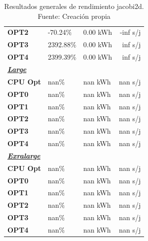 \begin{table}[H]
\begin{tabular}{lllr}
    \cellcolor[HTML]{DAE8FC} \textbf{OPT2} & -70.24\%  &	0.00 kWh  &	-inf s/j \\
    \rowcolor[HTML]{EFEFEF} \cellcolor[HTML]{DAE8FC} \textbf{OPT3} &2392.88\%  &	0.00 kWh  &	inf s/j \\
    \cellcolor[HTML]{DAE8FC} \textbf{OPT4} & 2399.39\%  &	0.00 kWh  &	inf s/j \\
    \rowcolor[HTML]{EFEFEF} \cellcolor[HTML]{DAE8FC} \textbf{\textbf{{\emph{{\underline{{Large}}}}}}} &&	&	 \\
    \cellcolor[HTML]{DAE8FC} \textbf{CPU Opt} & nan\%  &	nan kWh  &	nan s/j \\
    \rowcolor[HTML]{EFEFEF} \cellcolor[HTML]{DAE8FC} \textbf{OPT0} &nan\%  &	nan kWh  &	nan s/j \\
    \cellcolor[HTML]{DAE8FC} \textbf{OPT1} & nan\%  &	nan kWh  &	nan s/j \\
    \rowcolor[HTML]{EFEFEF} \cellcolor[HTML]{DAE8FC} \textbf{OPT2} &nan\%  &	nan kWh  &	nan s/j \\
    \cellcolor[HTML]{DAE8FC} \textbf{OPT3} & nan\%  &	nan kWh  &	nan s/j \\
    \rowcolor[HTML]{EFEFEF} \cellcolor[HTML]{DAE8FC} \textbf{OPT4} &nan\%  &	nan kWh  &	nan s/j \\
    \cellcolor[HTML]{DAE8FC} \textbf{\textbf{{\emph{{\underline{{Exralarge}}}}}}} & &	&	 \\
    \rowcolor[HTML]{EFEFEF} \cellcolor[HTML]{DAE8FC} \textbf{CPU Opt} &nan\%  &	nan kWh  &	nan s/j \\
    \cellcolor[HTML]{DAE8FC} \textbf{OPT0} & nan\%  &	nan kWh  &	nan s/j \\
    \rowcolor[HTML]{EFEFEF} \cellcolor[HTML]{DAE8FC} \textbf{OPT1} &nan\%  &	nan kWh  &	nan s/j \\
    \cellcolor[HTML]{DAE8FC} \textbf{OPT2} & nan\%  &	nan kWh  &	nan s/j \\
    \rowcolor[HTML]{EFEFEF} \cellcolor[HTML]{DAE8FC} \textbf{OPT3} &nan\%  &	nan kWh  &	nan s/j \\
    \cellcolor[HTML]{DAE8FC} \textbf{OPT4} & nan\%  &	nan kWh  &	nan s/j \\
    \end{tabular}
    \caption[Resultados generales de rendimiento jacobi2d]{{Resultados generales de rendimiento jacobi2d. Fuente: Creación propia}}
    \label{table_global_jacobi2d_PowerResults_speedup-energy}
\end{table}